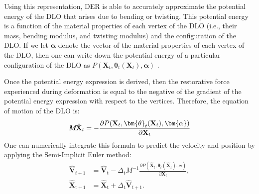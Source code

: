 Using this representation, DER is able to accurately approximate the potential energy of the DLO that arises due to bending or twisting. 
This potential energy is a function of the material properties of each vertex of the DLO (i.e., their mass, bending modulus, and twisting modulus) and the configuration of the DLO.
If we let $\bm{\alpha}$ denote the vector of the material properties of each vertex of the DLO, then one can write down the potential energy of a particular configuration of the DLO as $P(\textbf{X}_t, \bm{\theta}_t(\textbf{X}_t),\bm{\alpha})$ \cite[Section 4.2]{originalDER}.

Once the potential energy expression is derived, then the restorative force experienced during deformation is equal to the negative of the gradient of the potential energy expression with respect to the vertices. Therefore, the equation of motion of the DLO is:
\begin{equation}
       \textit{\textbf{M}}\ddot{\textbf{X}}_{t} = -\frac{\partial P(\textbf{X}_t, \bm{\theta}_t(\textbf{X}_t),\bm{\alpha})}{\partial  \textbf{X}_{t}}
       \label{eq:Integration}
\end{equation}
One can numerically integrate this formula to predict the velocity and position by applying the Semi-Implicit Euler method:
\begin{align}
        \hat{\textbf{V}}_{t+1} &= \hat{\textbf{V}}_\text{t}-\Delta_\text{t}M^{-1}\frac{\partial P(\hat{\textbf{X}}_t, \bm{\theta}_t(\hat{\textbf{X}}_t),\bm{\alpha})}{\partial \textbf{X}_{t}}, \label{eq:Semi-Euler1}\\  
        \hat{\textbf{X}}_{\text{t}+1} &= \hat{\textbf{X}}_\text{t} + \Delta_\text{t}\hat{\textbf{V}}_{t+1}.
       \label{eq:Semi-Euler2}
\end{align}

